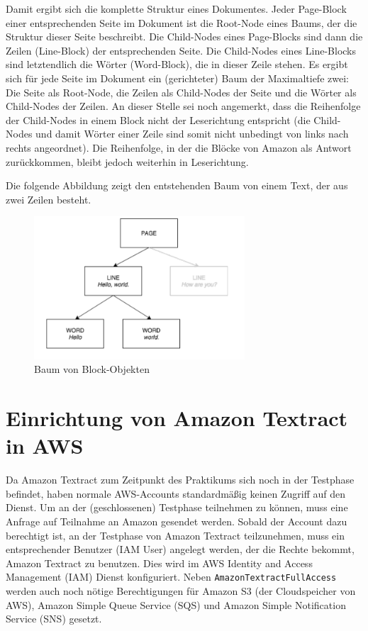 \documentclass{whswinvcbook}
\begin{document}
Damit ergibt sich die komplette Struktur eines Dokumentes. Jeder Page-Block einer entsprechenden Seite im Dokument ist die Root-Node eines Baums, der die Struktur dieser Seite beschreibt. Die Child-Nodes eines Page-Blocks sind dann die Zeilen (Line-Block) der entsprechenden Seite. Die Child-Nodes eines Line-Blocks sind letztendlich die Wörter (Word-Block), die in dieser Zeile stehen. Es ergibt sich für jede Seite im Dokument ein (gerichteter) Baum der Maximaltiefe zwei: Die Seite als Root-Node, die Zeilen als Child-Nodes der Seite und die Wörter als Child-Nodes der Zeilen. An dieser Stelle sei noch angemerkt, dass die Reihenfolge der Child-Nodes in einem Block nicht der Leserichtung entspricht (die Child-Nodes und damit Wörter einer Zeile sind somit nicht unbedingt von links nach rechts angeordnet). Die Reihenfolge, in der die Blöcke von Amazon als Antwort zurückkommen, bleibt jedoch weiterhin in Leserichtung.

Die folgende Abbildung zeigt den entstehenden Baum von einem Text, der aus zwei Zeilen besteht.
\begin{figure}[H]
    \centering
    \includegraphics[width=0.7\textwidth]{img/textract_tree.png}
    \caption{Baum von Block-Objekten}
    \label{fig-textract-tree}
\end{figure}
\section{Einrichtung von Amazon Textract in AWS}
Da Amazon Textract zum Zeitpunkt des Praktikums sich noch in der Testphase befindet, haben normale AWS-Accounts standardmäßig keinen Zugriff auf den Dienst. Um an der (geschlossenen) Testphase teilnehmen zu können, muss eine Anfrage auf Teilnahme an Amazon gesendet werden. Sobald der Account dazu berechtigt ist, an der Testphase von Amazon Textract teilzunehmen, muss ein entsprechender Benutzer (IAM User) angelegt werden, der die Rechte bekommt, Amazon Textract zu benutzen. Dies wird im AWS Identity and Access Management (IAM) Dienst konfiguriert. Neben \texttt{AmazonTextractFullAccess} werden auch noch nötige Berechtigungen für Amazon S3 (der Cloudspeicher von AWS), Amazon Simple Queue Service (SQS) und Amazon Simple Notification Service (SNS) gesetzt.
\end{document}
